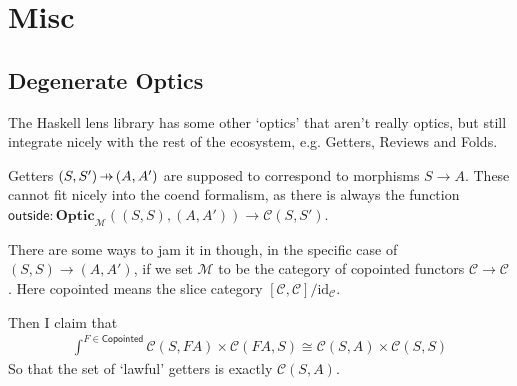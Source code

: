 \documentclass[11pt,a4paper]{article}
\makeatletter
\theoremstyle{plain}
\newtheorem{theorem}{Theorem}[subsection]
\theoremstyle{definition}
\newcommand{\C}{\mathscr{C}}
\newcommand{\M}{\mathscr{M}}
\newcommand{\Optic}{\mathbf{Optic}}
\newcommand{\id}{\mathrm{id}}
\newcommand{\outside}{\mathsf{outside}}
\newcommand{\hto}{\ensuremath{\,\mathaccent\shortmid\rightarrow\,}}
\providecommand{\leftsquigarrow}{%
  \mathrel{\mathpalette\reflect@squig\relax}%
}
\newcommand{\reflect@squig}[2]{%
  \reflectbox{$\m@th#1\rightsquigarrow$}%
}
\newcommand{\todo}[1]{\textcolor{red}{\small #1}}
\makeatother
\begin{document}
%
%
%

\section{Misc}
\subsection{Degenerate Optics}
The Haskell lens library has some other `optics' that aren't really optics, but still integrate nicely with the rest of the ecosystem, e.g. Getters, Reviews and Folds.

Getters $(S, S') \hto (A, A')$ are supposed to correspond to morphisms $S \to A$. These cannot fit nicely into the coend formalism, as there is always the function $\outside : \Optic_\M((S, S), (A, A')) \to \C(S, S')$.

There are some ways to jam it in though, in the specific case of $(S, S) \to (A, A')$, if we set $\M$ to be the category of copointed functors $\C \to \C$. Here copointed means the slice category $[\C, \C] / \id_\C$.

Then I claim that
\begin{align*}
  \int^{F \in \mathsf{Copointed}} \C(S, FA) \times \C(FA, S) \cong \C(S, A) \times \C(S, S)
\end{align*}
So that the set of `lawful' getters is exactly $\C(S, A)$.
\end{document}
